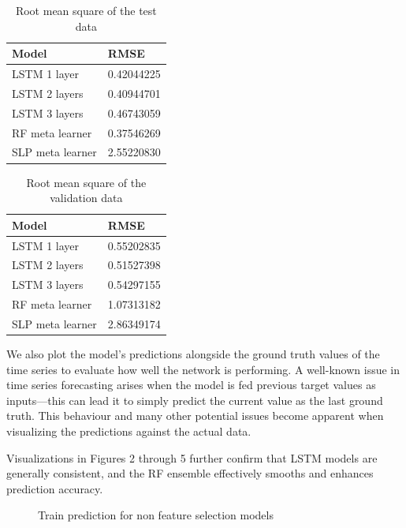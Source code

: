 \documentclass[12pt]{article}
\begin{document}
\begin{table}[h]
\centering
\begin{tabular}{|l|l|}
\hline
Model            & RMSE       \\ \hline
LSTM 1 layer     & 0.42044225 \\ \hline
LSTM 2 layers    & 0.40944701 \\ \hline
LSTM 3 layers    & 0.46743059 \\ \hline
RF meta learner  & 0.37546269 \\ \hline
SLP meta learner & 2.55220830 \\ \hline
\end{tabular}
\caption{Root mean square of the test data}
\end{table}

\begin{table}[h]
\centering
\begin{tabular}{|l|l|}
\hline
Model            & RMSE       \\ \hline
LSTM 1 layer     & 0.55202835 \\ \hline
LSTM 2 layers    & 0.51527398 \\ \hline
LSTM 3 layers    & 0.54297155 \\ \hline
RF meta learner  & 1.07313182 \\ \hline
SLP meta learner & 2.86349174 \\ \hline
\end{tabular}
\caption{Root mean square of the validation data}
\end{table}

We also plot the model's predictions alongside the ground truth values of the time series to evaluate how well the network is performing. A well-known issue in time series forecasting arises when the model is fed previous target values as inputs—this can lead it to simply predict the current value as the last ground truth. This behaviour and many other potential issues become apparent when visualizing the predictions against the actual data.

Visualizations in Figures 2 through 5 further confirm that LSTM models are generally consistent, and the RF ensemble effectively smooths and enhances prediction accuracy.

\begin{figure}[H]
\centering
{}%
\hfill %
%
\hfill %
%
\caption{Train prediction for non feature selection models}
\end{figure}
\end{document}
